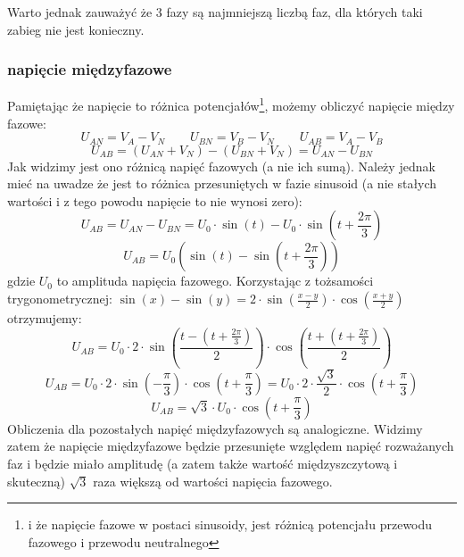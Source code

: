 %
Warto jednak zauważyć że 3 fazy są najmniejszą liczbą faz, dla których taki zabieg nie jest konieczny.


\subsubsection{napięcie międzyfazowe}

\noindent
Pamiętając że napięcie to różnica potencjałów\footnote{i że napięcie fazowe w postaci sinusoidy, jest różnicą potencjału przewodu fazowego i przewodu neutralnego}, możemy obliczyć napięcie między fazowe:
	$$U_{AN} = V_A - V_N \qquad U_{BN} = V_B - V_N \qquad U_{AB} = V_A - V_B$$
	$$U_{AB} = (U_{AN} + V_N) - (U_{BN} + V_N) = U_{AN} - U_{BN}$$
Jak widzimy jest ono różnicą napięć fazowych (a nie ich sumą).
Należy jednak mieć na uwadze że jest to różnica przesuniętych w fazie sinusoid (a nie stałych wartości i z tego powodu napięcie to nie wynosi zero):
	$$U_{AB} = U_{AN} - U_{BN} = U_0 \cdot \sin(t) - U_0 \cdot \sin\left( t + \frac{2\pi}{3} \right)$$
	$$U_{AB} = U_0 \left( \sin(t) - \sin\left( t + \frac{2\pi}{3} \right) \right)$$
gdzie $U_0$ to amplituda napięcia fazowego.
%
Korzystając z tożsamości trygonometrycznej: $\sin(x) - \sin(y) = 2 \cdot \sin(\frac{x - y}{2}) \cdot \cos(\frac{x + y}{2})$ otrzymujemy:
	$$U_{AB} = U_0 \cdot 2 \cdot \sin\left( \frac{t - (t + \frac{2\pi}{3})}{2} \right) \cdot \cos\left( \frac{t + (t + \frac{2\pi}{3})}{2} \right)$$
	$$U_{AB} = U_0 \cdot 2 \cdot \sin\left( -\frac{\pi}{3} \right) \cdot \cos\left( t + \frac{\pi}{3} \right) = U_0 \cdot 2 \cdot \frac{\sqrt{3}}{2} \cdot \cos\left( t + \frac{\pi}{3} \right)$$
	$$U_{AB} = \sqrt{3} \cdot U_0 \cdot \cos\left( t + \frac{\pi}{3} \right)$$
Obliczenia dla pozostałych napięć międzyfazowych są analogiczne.
Widzimy zatem że napięcie międzyfazowe będzie przesunięte względem napięć rozważanych faz i będzie miało amplitudę (a zatem także wartość międzyszczytową i skuteczną) $\sqrt{3}$ raza większą od wartości napięcia fazowego.

